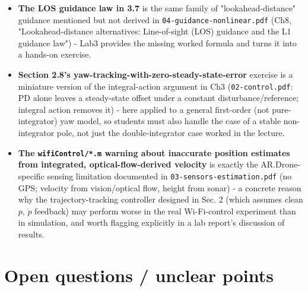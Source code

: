\documentclass[11pt]{article}
\begin{document}
\begin{itemize}
\item \textbf{The LOS guidance law in 3.7} is the same family of "lookahead-distance" guidance mentioned but not derived in \texttt{04-\allowbreak{}guidance-\allowbreak{}nonlinear.pdf} (Ch8, "Lookahead-distance alternatives: Line-of-sight (LOS) guidance and the L1 guidance law") - Lab3 provides the missing worked formula and turns it into a hands-on exercise.
\item \textbf{Section 2.8's yaw-tracking-with-zero-steady-state-error} exercise is a miniature version of the integral-action argument in Ch3 (\texttt{02-\allowbreak{}control.pdf}: PD alone leaves a steady-state offset under a constant disturbance/reference; integral action removes it) - here applied to a general first-order (not pure-integrator) yaw model, so students must also handle the case of a stable non-integrator pole, not just the double-integrator case worked in the lecture.
\item \textbf{The \texttt{wifiControl/*.m} warning about inaccurate position estimates from integrated, optical-flow-derived velocity} is exactly the AR.Drone-specific sensing limitation documented in \texttt{03-\allowbreak{}sensors-\allowbreak{}estimation.pdf} (no GPS; velocity from vision/optical flow, height from sonar) - a concrete reason why the trajectory-tracking controller designed in Sec. 2 (which assumes clean $p$, $\dot p$ feedback) may perform worse in the real Wi-Fi-control experiment than in simulation, and worth flagging explicitly in a lab report's discussion of results.
\end{itemize}

\section{Open questions / unclear points}
\end{document}
